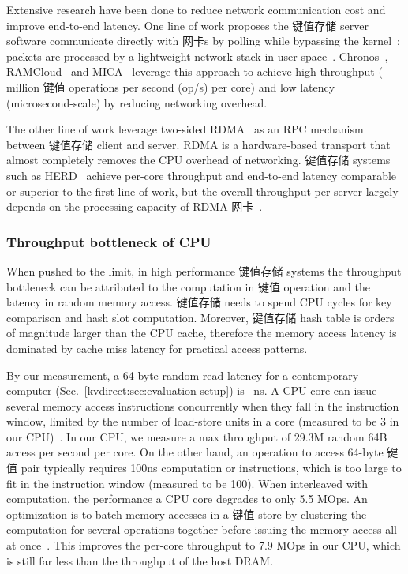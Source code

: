 {Extensive research have been done to reduce network communication cost and improve end-to-end latency.
One line of work proposes the 键值存储 server software communicate directly with 网卡s by polling while bypassing the kernel~\cite{rizzo2012netmap, intel2014data}; packets are processed by a lightweight network stack in user space~\cite{jeong2014mtcp, marinos2014network}.
Chronos~\cite{kapoor2012chronos}, RAMCloud~\cite{ousterhout2010case, ousterhout2015ramcloud} and MICA~\cite{lim2014mica,li2016full} leverage this approach to achieve high throughput ( million 键值 operations per second (op/s) per core) and low latency (microsecond-scale) by reducing networking overhead.

The other line of work leverage two-sided RDMA~\cite{infiniband2000infiniband} as an RPC mechanism between 键值存储 client and server.
RDMA is a hardware-based transport that almost completely removes the CPU overhead of networking.
键值存储 systems such as HERD~\cite{kalia2014using, kalia2016design} achieve per-core throughput and end-to-end latency comparable or superior to the first line of work, but the overall throughput per server largely depends on the processing capacity of RDMA 网卡~\cite{kalia2016design}.

\subsubsection{Throughput bottleneck of CPU}
\label{kvdirect:sec:CPU-键值-Bottleneck}
When pushed to the limit, in high performance 键值存储 systems the throughput bottleneck can be attributed to the computation in 键值 operation and the latency in random memory access. 键值存储 needs to spend CPU cycles for key comparison and hash slot computation. Moreover, 键值存储 hash table is orders of magnitude larger than the CPU cache, therefore the memory access latency is dominated by cache miss latency for practical access patterns.

By our measurement, a 64-byte random read latency for a contemporary computer (Sec.~\ref{kvdirect:sec:evaluation-setup}) is ~ns. A CPU core can issue several memory access instructions concurrently when they fall in the instruction window, limited by the number of load-store units in a core (measured to be 3 in our CPU)~\cite{gharachorloo1992hiding, han2010packetshader, zhang2015mega}. In our CPU, we measure a max throughput of 29.3M random 64B access per second per core. On the other hand, an operation to access 64-byte 键值 pair typically requires \approx100ns computation or  instructions, which is too large to fit in the instruction window (measured to be 100). When interleaved with computation, the performance a CPU core degrades to only 5.5 MOps. An optimization is to batch memory accesses in a 键值 store by clustering the computation for several operations together before issuing the memory access all at once~\cite{li2016full, narula2014phase}. This improves the per-core throughput to 7.9 MOps in our CPU, which is still far less than the throughput of the host DRAM. 
}

